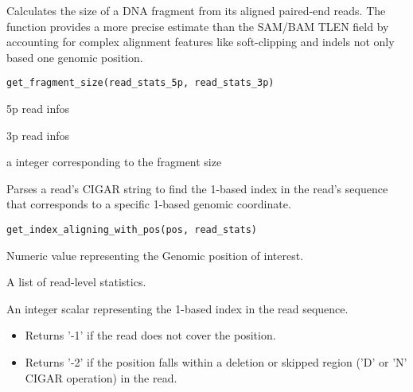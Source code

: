 \documentclass[a4paper]{book}
\begin{document}
%
\begin{Description}
Calculates the size of a DNA fragment from its aligned paired-end reads. The function provides a more precise
estimate than the SAM/BAM TLEN field by accounting for complex alignment features like soft-clipping and indels not
only based one genomic position.
\end{Description}
%
\begin{Usage}
\begin{verbatim}
get_fragment_size(read_stats_5p, read_stats_3p)
\end{verbatim}
\end{Usage}
%
\begin{Arguments}
\begin{ldescription}
\item[\code{read\_stats\_5p}] 5p read infos

\item[\code{read\_stats\_3p}] 3p read infos
\end{ldescription}
\end{Arguments}
%
\begin{Value}
a integer corresponding to the fragment size
\end{Value}
%
\begin{Description}
Parses a read's CIGAR string to find the 1-based index in the read's sequence that corresponds to a
specific 1-based genomic coordinate.
\end{Description}
%
\begin{Usage}
\begin{verbatim}
get_index_aligning_with_pos(pos, read_stats)
\end{verbatim}
\end{Usage}
%
\begin{Arguments}
\begin{ldescription}
\item[\code{pos}] Numeric value representing the Genomic position of interest.

\item[\code{read\_stats}] A list of read-level statistics.
\end{ldescription}
\end{Arguments}
%
\begin{Value}
An integer scalar representing the 1-based index in the read sequence.
\begin{itemize}

\item{} Returns '-1' if the read does not cover the position.
\item{} Returns '-2' if the position falls within a deletion or skipped
region ('D' or 'N' CIGAR operation) in the read.

\end{itemize}

\end{Value}
\end{document}
